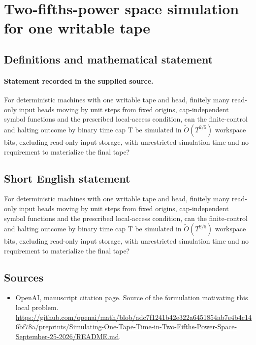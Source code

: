 \documentclass[11pt]{article}
\begin{document}
\section*{Two-fifths-power space simulation for one writable tape}\label{statement}
\subsection{Definitions and mathematical statement}
\paragraph{Statement recorded in the supplied source.}
For deterministic machines with one writable tape and head, finitely many read-only input heads moving by unit steps from fixed origins, cap-independent symbol functions and the prescribed local-access condition, can the finite-control and halting outcome by binary time cap T be simulated in $\widetilde O(T^{2/5})$ workspace bits, excluding read-only input storage, with unrestricted simulation time and no requirement to materialize the final tape?
\subsection{Short English statement}
For deterministic machines with one writable tape and head, finitely many read-only input heads moving by unit steps from fixed origins, cap-independent symbol functions and the prescribed local-access condition, can the finite-control and halting outcome by binary time cap T be simulated in $\widetilde O(T^{2/5})$ workspace bits, excluding read-only input storage, with unrestricted simulation time and no requirement to materialize the final tape?
\subsection{Sources}
\begin{itemize}
\item[S1] OpenAI, manuscript citation page. Source of the formulation motivating this local problem.
\url{https://github.com/openai/math/blob/adc7f1241b42e322a6451854ab7e4b4c146bf78a/preprints/Simulating-One-Tape-Time-in-Two-Fifths-Power-Space-September-25-2026/README.md}.
\end{itemize}
\end{document}
